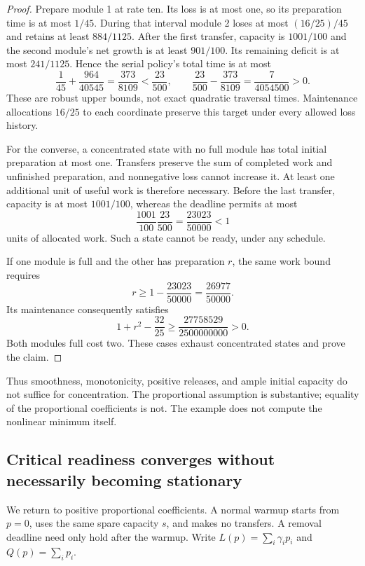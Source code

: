 \begin{proof}
Prepare module 1 at rate ten. Its loss is at most one, so its preparation
time is at most $1/45$. During that interval module 2 loses at most
$(16/25)/45$ and retains at least $884/1125$. After the first transfer,
capacity is $1001/100$ and the second module's net growth is at least
$901/100$. Its remaining deficit is at most $241/1125$. Hence the serial
policy's total time is at most
\[
 \frac1{45}+\frac{964}{40545}
 =\frac{373}{8109}<\frac{23}{500},
 \qquad
 \frac{23}{500}-\frac{373}{8109}=\frac7{4054500}>0.
\]
These are robust upper bounds, not exact quadratic traversal times.
Maintenance allocations $16/25$ to each coordinate preserve this target
under every allowed loss history.

For the converse, a concentrated state with no full module has total
initial preparation at most one. Transfers preserve the sum of completed
work and unfinished preparation, and nonnegative loss cannot increase it.
At least one additional unit of useful work is therefore necessary. Before
the last transfer, capacity is at most $1001/100$, whereas the deadline
permits at most
\[
 \frac{1001}{100}\frac{23}{500}
 =\frac{23023}{50000}<1
\]
units of allocated work. Such a state cannot be ready, under any schedule.

If one module is full and the other has preparation $r$, the same work
bound requires
\[
 r\geq 1-\frac{23023}{50000}=\frac{26977}{50000}.
\]
Its maintenance consequently satisfies
\[
 1+r^2-\frac{32}{25}
 \geq \frac{27758529}{2500000000}>0.
\]
Both modules full cost two. These cases exhaust concentrated states and
prove the claim.
\end{proof}

Thus smoothness, monotonicity, positive releases, and ample initial
capacity do not suffice for concentration. The proportional assumption is
substantive; equality of the proportional coefficients is not. The example
does not compute the nonlinear minimum itself.

\subsection{Critical readiness converges without necessarily becoming stationary}
\label{sec:startup-boundary}

We return to positive proportional coefficients. A normal warmup starts
from $p=0$, uses the same spare capacity $s$, and makes no transfers. A
removal deadline need only hold after the warmup. Write
$L(p)=\sum_i\gamma_i p_i$ and $Q(p)=\sum_i p_i$.

